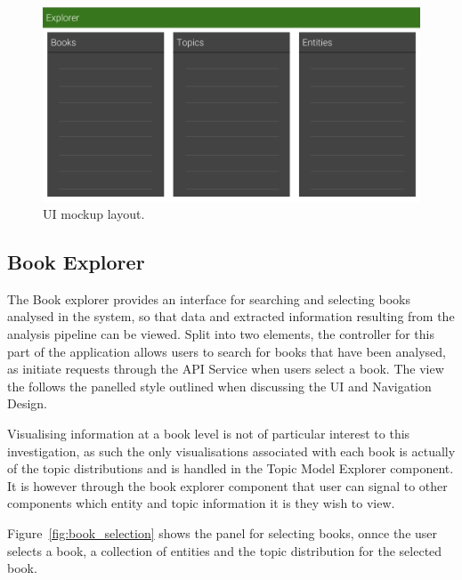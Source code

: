 \documentclass[10pt]{report}
\begin{document}
\begin{figure}[h!]
\includegraphics[scale=0.4]{ui_layout_drawing}
\caption{UI mockup layout. \label{fig:ui_layout_sketchup}}
\end{figure}

\subsection{Book Explorer}
The Book explorer provides an interface for searching and selecting books analysed in the system, so that data and extracted information resulting from the analysis pipeline can be viewed. Split into two elements, the controller for this part of the application allows users to search for books that have been analysed, as initiate requests through the API Service when users select a book. The view the follows the panelled style outlined when discussing the UI and Navigation Design.

Visualising information at a book level is not of particular interest to this investigation, as such the only visualisations associated with each book is actually of the topic distributions and is handled in the Topic Model Explorer component. It is however through the book explorer component that user can signal to other components which entity and topic information it is they wish to view.

Figure~\ref{fig:book_selection} shows the panel for selecting books, onnce the user selects a book, a collection of entities and the topic distribution for the selected book.
\end{document}
